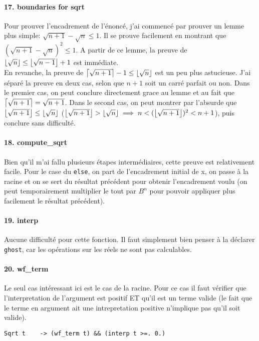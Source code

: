 \documentclass[a4paper]{article}%
\DeclarePairedDelimiter\ceil{\lceil}{\rceil}
\DeclarePairedDelimiter\floor{\lfloor}{\rfloor}
\begin{document}
	\paragraph{17. boundaries for sqrt} Pour prouver l'encadrement de l'énoncé, j'ai commencé par prouver un lemme plus simple:
	$\sqrt{n+1}-\sqrt{n}\leq 1$. Il se prouve facilement en montrant que $(\sqrt{n+1}-\sqrt{n})^2\leq 1$.
	A partir de ce lemme, la preuve de $\floor*{\sqrt{n}} \leq \floor*{\sqrt{n-1}}+1$ est immédiate.\\
	En revanche, la preuve de $\ceil*{\sqrt{n+1}}-1 \leq \floor*{\sqrt{n}}$ est un peu plus astucieuse.
	J'ai séparé la preuve en deux cas, selon que $n+1$ soit un carré parfait ou non. Dans le premier cas,
	on peut conclure directement grace au lemme et au fait que $\ceil*{\sqrt{n+1}}=\sqrt{n+1}$.
	Dans le second cas, on peut montrer par l'absurde que $\floor*{\sqrt{n+1}}\leq \floor*{\sqrt{n}}$
	($\floor*{\sqrt{n+1}} > \floor*{\sqrt{n}} \implies n < (\floor*{\sqrt{n+1}})^2 < n+1$),
	puis conclure sans difficulté.

	\paragraph{18. compute\_sqrt} Bien qu'il m'ai fallu plusieurs étapes intermédiaires, cette preuve est relativement
	facile. Pour le case du \texttt{else}, on part de l'encadrement initial de x, on passe à la racine et on se sert du résultat
	précédent pour obtenir l'encadrement voulu (on peut temporairement multiplier le tout par $B^n$ pour pouvoir appliquer plus
	facilement le résultat précédent).

	\paragraph{19. interp} Aucune difficulté pour cette fonction. Il faut simplement bien penser à la déclarer \texttt{ghost},
	car les opérations sur les réels ne sont pas calculables.

	\paragraph{20. wf\_term} Le seul cas intéressant ici est le cas de la racine. Pour ce cas il faut vérifier que l'interpretation
	de l'argument est positif ET qu'il est un terme valide (le fait que le terme en argument ait une intrepretation positive
	n'implique pas qu'il soit valide).
	\begin{verbatim}
Sqrt t    -> (wf_term t) && (interp t >=. 0.)
	\end{verbatim}
\end{document}
